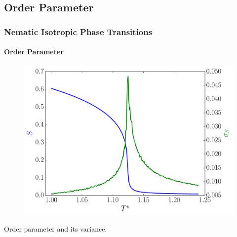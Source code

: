\documentclass{beamer}
\begin{document}
\subsection{Order Parameter}
\begin{frame}
	\frametitle{Nematic Isotropic Phase Transitions}
	\framesubtitle{Order Parameter}

\begin{figure}
\includegraphics[scale=0.48]{figures/local_order.pdf}
\end{figure}
\vspace{-0.6cm}
\center Order parameter and its variance.
\end{frame}
\end{document}
